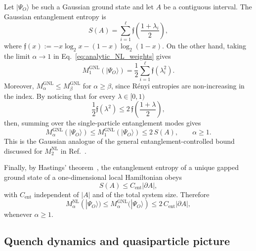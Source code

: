 \documentclass[prx,twocolumn,superscriptaddress,aps,10pt, frontmatterverbose, reprint,footinbib,longbibliography=true]{revtex4-2}
\newcommand{\RENYI}{\alpha}
\begin{document}
Let $|\Psi_O\rangle$ be such a Gaussian ground state and let $A$ be a contiguous interval. The Gaussian entanglement entropy is
\begin{equation}
    S(A)=
    \sum_{i=1}^{\ell}
    \mathfrak{f}\!\left(\frac{1+\lambda_i}{2}\right),
    \label{eq:gaussian_entropy_area_law_sec}
\end{equation}
where $\mathfrak{f}(x):=-x\log_2x-(1-x)\log_2(1-x)$. On the other hand, taking the limit \(\RENYI\to1\) in Eq.~\eqref{eq:analytic_NL_weights} gives
\begin{equation}
    M_{1}^{\mathrm{GNL}}(|\Psi_O\rangle)
    =
    \frac{1}{2}
    \sum_{i=1}^{\ell}
    \mathfrak{f}(\lambda_i^2).
    \label{eq:M1_GNL}
\end{equation}
Moreover, $M_{\alpha}^{\mathrm{GNL}}\le M_{\beta}^{\mathrm{GNL}}$ for $\alpha\ge\beta$, since R\'enyi entropies are non-increasing in the index. By noticing that for every $\lambda\in[0,1)$
\begin{equation}
    \frac{1}{2}\mathfrak{f}(\lambda^2)
    \le
    2\, \mathfrak{f}\!\left(\frac{1+\lambda}{2}\right),
    \label{eq:m1_entropy_bound}
\end{equation}
then, summing over the single-particle entanglement modes gives
\begin{equation}
    M_{\RENYI}^{\mathrm{GNL}}(|\Psi_O\rangle)
    \le
    M_{1}^{\mathrm{GNL}}(|\Psi_O\rangle)
    \le
    2\, S(A),
    \qquad
    \RENYI\ge1.
    \label{eq:GNL_bound_by_entropy_all_alpha}
\end{equation}
This is the Gaussian analogue of the general entanglement-controlled bound discussed for $M_2^{\mathrm{NL}}$ in Ref.~\cite{Cao_2025}.

Finally, by Hastings' theorem~\cite{Hastings_2007}, the entanglement entropy of a unique gapped ground state of a one-dimensional local Hamiltonian obeys
\begin{equation}
    S(A)\le C_{\mathrm{ent}}|\partial A|,
    \label{eq:Hastings_area_law}
\end{equation}
with $C_{\mathrm{ent}}$ independent of $|A|$ and of the total system size. Therefore
\begin{equation}
    M_{\RENYI}^{\mathrm{NL}}(|\Psi_O\rangle)
    \le
    M_{\RENYI}^{\mathrm{GNL}}(|\Psi_O\rangle)
    \le
    2\, C_{\mathrm{ent}}|\partial A|,
    \label{eq:GNL_area_law_final}
\end{equation}
whenever $\RENYI\ge1$. 

\subsection{Quench dynamics and quasiparticle picture}
\end{document}
